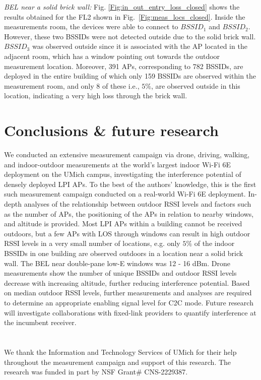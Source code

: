 \documentclass[sigconf,10pt]{acmart}
\begin{document}
{\it BEL near a solid brick wall:} Fig. \ref{Fig:in_out_entry_loss_closed} shows the results obtained for the FL2 shown in Fig.~\ref{Fig:meas_locs_closed}. Inside the  measurements room, the devices were able to connect to $BSSID_1$ and $BSSID_2$.
However, these two BSSIDs were not detected outside due to the solid brick wall. $BSSID_3$ was observed outside since it is associated with the AP located in the adjacent room, which has a window pointing out towards the outdoor measurement location. Moreover, 391 APs, corresponding to 782 BSSIDs, are deployed in the entire building of which only 159 BSSIDs are observed within the measurement room, and only 8 of these i.e., $5\%$, are observed outside in this location, indicating a very high loss through the brick wall.

\section{Conclusions \& future research}

We conducted an extensive measurement campaign via drone, driving, walking, and indoor-outdoor measurements at the world's largest indoor Wi-Fi 6E deployment on the UMich campus, investigating the interference potential of densely deployed LPI APs. To the best of the authors' knowledge, this is the first such measurement campaign conducted on a real-world Wi-Fi 6E deployment. In-depth analyses of the relationship between outdoor RSSI levels and factors such as the number of APs, the positioning of the APs in relation to nearby windows, and altitude is provided.  Most LPI APs within a building cannot be received outdoors, but a few APs with LOS through windows can result in high outdoor RSSI levels in a very small number of locations, e.g. only $5\%$ of the indoor BSSIDs in one building are observed outdoors in a location near a solid brick wall.
The BEL near double-pane low-E windows was 12 - 16 dBm. Drone measurements show the number of unique BSSIDs and outdoor RSSI levels decrease with increasing altitude, further reducing interference potential. Based on median outdoor RSSI levels, further measurements and analyses are required to determine an appropriate enabling signal level for C2C mode. Future research will investigate collaborations with fixed-link providers to quantify interference at the incumbent receiver.


\section*{}
We thank the Information and Technology Services of UMich for their help throughout the measurement campaign and support of this research. 
The research was funded in part by NSF Grant\# CNS-2229387.



\end{document}
